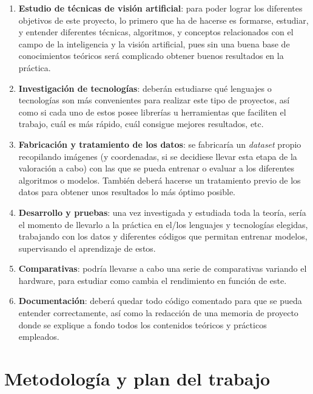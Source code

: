 \documentclass[12pt]{article}
\begin{document}
		\begin{enumerate}[label = \textbf{\arabic*. }]
			\item \textbf{Estudio de técnicas de visión artificial}: para poder lograr los diferentes objetivos de este proyecto, lo primero que ha de hacerse es formarse, estudiar, y entender diferentes técnicas, algoritmos, y conceptos relacionados con el campo de la inteligencia y la visión artificial, pues sin una buena base de conocimientos teóricos será complicado obtener buenos resultados en la práctica. 
			
			\item \textbf{Investigación de tecnologías}: deberán estudiarse qué lenguajes o tecnologías son más convenientes para realizar este tipo de proyectos, así como si cada uno de estos posee librerías u herramientas que faciliten el trabajo, cuál es más rápido, cuál consigue mejores resultados, etc. 
			
			\item \textbf{Fabricación y tratamiento de los datos}: se fabricaría un \textit{dataset} propio recopilando imágenes (y coordenadas, si se decidiese llevar esta etapa de la valoración a cabo) con las que se pueda entrenar o evaluar a los diferentes algoritmos o modelos. También deberá hacerse un tratamiento previo de los datos para obtener unos resultados lo más óptimo posible. 
			
			\item \textbf{Desarrollo y pruebas}: una vez investigada y estudiada toda la teoría, sería el momento de llevarlo a la práctica en el/los lenguajes y tecnologías elegidas, trabajando con los datos y diferentes códigos que permitan entrenar modelos, supervisando el aprendizaje de estos. 
			
			\item \textbf{Comparativas}: podría llevarse a cabo una serie de comparativas variando el hardware, para estudiar como cambia el rendimiento en función de este. 
			
			\item \textbf{Documentación}: deberá quedar todo código comentado para que se pueda entender correctamente, así como la redacción de una memoria de proyecto donde se explique a fondo todos los contenidos teóricos y prácticos empleados. 
		\end{enumerate}
	
	\section{Metodología y plan del trabajo}
	
\end{document}
